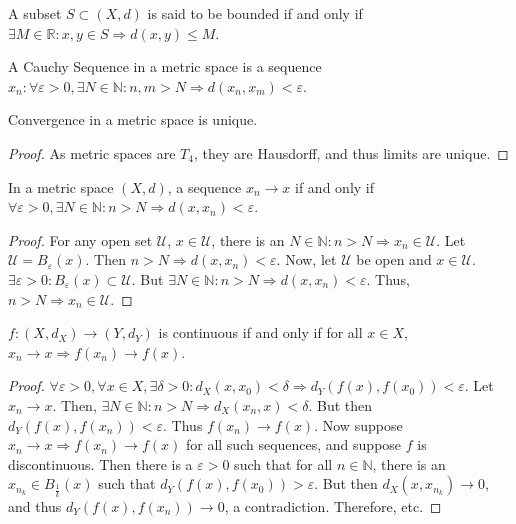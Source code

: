 \documentclass[crop=false,class=article,oneside]{standalone}
\begin{document}
            \begin{definition}
            A subset $S\subset (X,d)$ is said to be bounded if and only if $\exists M\in \mathbb{R}:x,y\in S\Rightarrow d(x,y)\leq M$.
            \end{definition}
            \begin{definition}
            A Cauchy Sequence in a metric space is a sequence $x_n:\forall \varepsilon>0,\exists N\in \mathbb{N}:n,m>N\Rightarrow d(x_n,x_m)<\varepsilon$.
            \end{definition}
            \begin{corollary}
            Convergence in a metric space is unique.
            \end{corollary}
            \begin{proof}
            As metric spaces are $T_4$, they are Hausdorff, and thus limits are unique.
            \end{proof}
            \begin{theorem}
            In a metric space $(X,d)$, a sequence $x_n\rightarrow x$ if and only if $\forall\varepsilon>0,\exists N\in \mathbb{N}:n>N\Rightarrow d(x,x_n)<\varepsilon$.
            \end{theorem}
            \begin{proof}
            For any open set $\mathcal{U}$, $x\in \mathcal{U}$, there is an $N\in \mathbb{N}:n>N\Rightarrow x_n \in \mathcal{U}$. Let $\mathcal{U}=B_{\varepsilon}(x)$. Then $n>N\Rightarrow d(x,x_n)<\varepsilon$. Now, let $\mathcal{U}$ be open and $x\in \mathcal{U}$. $\exists\varepsilon>0:B_{\varepsilon}(x)\subset \mathcal{U}$. But $\exists N\in \mathbb{N}:n>N\Rightarrow d(x,x_n)<\varepsilon$. Thus, $n>N\Rightarrow x_n\in \mathcal{U}$.
            \end{proof}
            \begin{theorem}
            $f:(X,d_X)\rightarrow (Y,d_Y)$ is continuous if and only if for all $x\in X$, $x_n\rightarrow x \Rightarrow f(x_n)\rightarrow f(x)$.
            \end{theorem}
            \begin{proof}
            $\forall \varepsilon>0,\forall x\in X,\exists \delta>0:d_X(x,x_0)<\delta \Rightarrow d_Y(f(x),f(x_0))<\varepsilon$. Let $x_n \rightarrow x$. Then, $\exists N\in \mathbb{N}:n>N \Rightarrow d_X(x_n,x)<\delta$. But then $d_Y(f(x),f(x_n)) < \varepsilon$. Thus $f(x_n)\rightarrow f(x)$. Now suppose $x_n\rightarrow x \Rightarrow f(x_n)\rightarrow f(x)$ for all such sequences, and suppose $f$ is discontinuous. Then there is a $\varepsilon>0$ such that for all $n\in \mathbb{N}$, there is an $x_{n_k} \in B_{\frac{1}{k}}(x)$ such that $d_Y(f(x),f(x_0))>\varepsilon$. But then $d_X(x,x_{n_k})\rightarrow 0$, and thus $d_Y(f(x),f(x_n))\rightarrow 0$, a contradiction. Therefore, etc.
            \end{proof}
\end{document}

